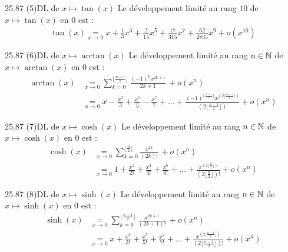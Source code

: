 \begin{adjustwidth}{-3cm}{-3cm}
\begin{proposition}{25.87 (5)}{DL de $x \mapsto \tan(x)$}
    Le développement limité au rang $10$ de $x \mapsto \tan(x)$ en $0$ est :
    \begin{align*}
        \tan(x) \underset{x \to 0}{=} x + \frac{1}{3}x^3 + \frac{2}{15}x^5 + \frac{17}{315}x^7 + \frac{62}{2835} x^9+ o(x^{10})
    \end{align*}
\end{proposition}

\begin{proposition}{25.87 (6)}{DL de $x \mapsto \arctan(x)$}
    Le développement limité au rang $n \in \mathbb{N}$ de $x \mapsto \arctan(x)$ en $0$ est :
    \begin{align*}
        \arctan(x) &\underset{x \to 0}{=} \sum_{k=0}^{\lfloor \frac{n-1}{2} \rfloor} \frac{(-1)^{k}x^{2k+1}}{2k+1} \, + o(x^n) \\
        &\underset{x \to 0}{=} x - \frac{x^3}{3} + \frac{x^5}{5} - \frac{x^7}{7} + \dots + \frac{(-1)^{\lfloor \frac{n-1}{2}\rfloor} x^{(2\lfloor\frac{n-1}{2}\rfloor)}}{(2\lfloor\frac{n-1}{2}\rfloor)} + o(x^n)
    \end{align*}
\end{proposition}

\begin{proposition}{25.87 (7)}{DL de $x \mapsto \cosh(x)$}
    Le développement limité au rang $n \in \mathbb{N}$ de $x \mapsto \cosh(x)$ en $0$ est :
    \begin{align*}
        \cosh(x) &\underset{x \to 0}{=} \sum_{k=0}^{\lfloor \frac{n}{2} \rfloor} \frac{x^{2k}}{(2k)!} \, + o(x^n) \\
        &\underset{x \to 0}{=} 1 + \frac{x^2}{2!} + \frac{x^4}{4!} + \frac{x^6}{6!} + \dots + \frac{x^{(2\lfloor\frac{n}{2}\rfloor)}}{(2\lfloor\frac{n}{2}\rfloor)!} + o(x^n)
    \end{align*}
\end{proposition}

\begin{proposition}{25.87 (8)}{DL de $x \mapsto \sinh(x)$}
    Le développement limité au rang $n \in \mathbb{N}$ de $x \mapsto \sinh(x)$ en $0$ est :
    \begin{align*}
        \sinh(x) &\underset{x \to 0}{=} \sum_{k=0}^{\lfloor \frac{n-1}{2} \rfloor} \frac{x^{2k+1}}{(2k+1)!} \, + o(x^n) \\
        &\underset{x \to 0}{=} x + \frac{x^3}{3!} + \frac{x^5}{5!} + \frac{x^7}{7!} + \dots + \frac{x^{(2\lfloor\frac{n-1}{2}\rfloor)}}{(2\lfloor\frac{n-1}{2}\rfloor)!} + o(x^n)
    \end{align*}
\end{proposition}


\end{adjustwidth}
